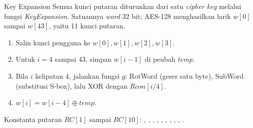 \documentclass[aspectratio=169,11pt]{beamer}
\begin{document}
\begin{frame}{Key Expansion}
    \footnotesize
    Semua kunci putaran diturunkan dari satu \textit{cipher key} melalui
    fungsi \textit{KeyExpansion}. Satuannya \textit{word} 32 bit; AES-128
    menghasilkan larik $w[0]$ sampai $w[43]$, yaitu 11 kunci putaran.
    \vspace{0.1cm}
    \begin{enumerate}
        \item Salin kunci pengguna ke $w[0], w[1], w[2], w[3]$.
        \item Untuk $i = 4$ sampai 43, simpan $w[i-1]$ di peubah
              \textit{temp}.
        \item Bila $i$ kelipatan 4, jalankan fungsi $g$: RotWord
              (geser satu byte), SubWord (substitusi S-box), lalu XOR
              dengan $Rcon[i/4]$.
        \item $w[i] = w[i-4] \oplus \textit{temp}$.
    \end{enumerate}
    \vspace{0.05cm}
    \begin{alertblock}{Konstanta putaran}
        \footnotesize
        $RC[1]$ sampai $RC[10]$: , , ,
        , , , , ,
        , .
    \end{alertblock}
\end{frame}
\end{document}
